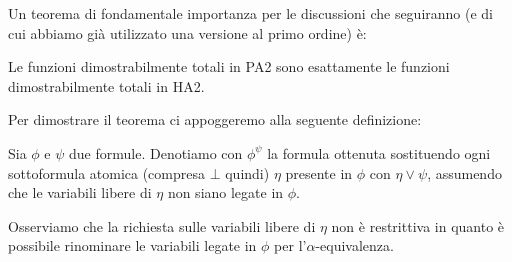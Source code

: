 \documentclass[]{marticle}
\begin{document}
Un teorema di fondamentale importanza per le discussioni che seguiranno (e di
cui abbiamo gi\`a utilizzato una versione al primo ordine) \`e:
\begin{block}[Teorema]
    Le funzioni dimostrabilmente totali in PA2 sono esattamente le funzioni
    dimostrabilmente totali in HA2.
\end{block}

Per dimostrare il teorema ci appoggeremo alla seguente definizione:
\begin{block}[Definizione]
    Sia $\phi$ e $\psi$ due formule. Denotiamo con $\phi^\psi$ la formula
    ottenuta sostituendo ogni sottoformula atomica (compresa $\bot$ quindi)
    $\eta$ presente in $\phi$ con $\eta\lor\psi$, assumendo che le variabili
    libere di $\eta$ non siano legate in $\phi$.
\end{block}

Osserviamo che la richiesta sulle variabili libere di $\eta$ non \`e restrittiva
in quanto \`e possibile rinominare le variabili legate in $\phi$ per
l'$\alpha$-equivalenza.
\end{document}
